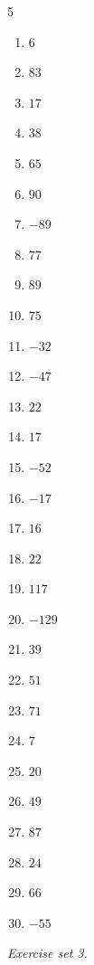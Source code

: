 \begin{multicols}{5}\raggedright
\begin{enumerate}[label=\arabic*., leftmargin=*, itemsep=1pt]
\item $6$
\item $83$
\item $17$
\item $38$
\item $65$
\item $90$
\item $-89$
\item $77$
\item $89$
\item $75$
\item $-32$
\item $-47$
\item $22$
\item $17$
\item $-52$
\item $-17$
\item $16$
\item $22$
\item $117$
\item $-129$
\item $39$
\item $51$
\item $71$
\item $7$
\item $20$
\item $49$
\item $87$
\item $24$
\item $66$
\item $-55$
\end{enumerate}
\end{multicols}
\par\noindent\emph{Exercise set 3.}\nopagebreak
